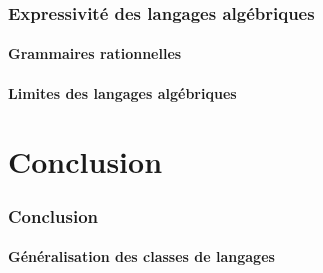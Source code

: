\documentclass[9pt, handout]{beamer}
\begin{document}
\section{Expressivité des langages algébriques}
 
\subsection{Grammaires rationnelles}






 
\subsection{Limites des langages algébriques}



 
 
\part{Conclusion}
 
 
\section{Conclusion}
 
\subsection{Généralisation des classes de langages}




 
\end{document}
